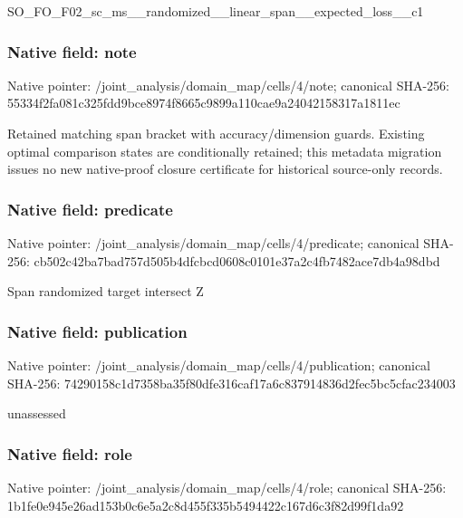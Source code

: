 \documentclass[10pt,a4paper]{article}
\begin{document}
\begingroup\raggedright\sloppy SO\_\allowbreak{}FO\_\allowbreak{}F02\_\allowbreak{}sc\_\allowbreak{}ms\_\allowbreak{}\_\allowbreak{}randomized\_\allowbreak{}\_\allowbreak{}linear\_\allowbreak{}span\_\allowbreak{}\_\allowbreak{}expected\_\allowbreak{}loss\_\allowbreak{}\_\allowbreak{}c1\par\endgroup

\subsubsection{Native field: note}
Native pointer: /joint\_\allowbreak{}analysis/domain\_\allowbreak{}map/cells/4/note; canonical SHA-256: 55334f2fa081c325fdd9bce8974f8665c9899a110cae9a24042158317a1811ec

\begingroup\raggedright\sloppy Retained matching span bracket with accuracy/\allowbreak{}dimension guards. Existing optimal comparison states are conditionally retained;\allowbreak{} this metadata migration issues no new native-proof closure certificate for historical source-only records.\par\endgroup

\subsubsection{Native field: predicate}
Native pointer: /joint\_\allowbreak{}analysis/domain\_\allowbreak{}map/cells/4/predicate; canonical SHA-256: cb502c42ba7bad757d505b4dfcbcd0608c0101e37a2c4fb7482ace7db4a98dbd

\begingroup\raggedright\sloppy Span randomized target intersect Z\par\endgroup

\subsubsection{Native field: publication}
Native pointer: /joint\_\allowbreak{}analysis/domain\_\allowbreak{}map/cells/4/publication; canonical SHA-256: 74290158c1d7358ba35f80dfe316caf17a6c837914836d2fec5bc5cfac234003

\begingroup\raggedright\sloppy unassessed\par\endgroup

\subsubsection{Native field: role}
Native pointer: /joint\_\allowbreak{}analysis/domain\_\allowbreak{}map/cells/4/role; canonical SHA-256: 1b1fe0e945e26ad153b0c6e5a2c8d455f335b5494422c167d6c3f82d99f1da92
\end{document}
